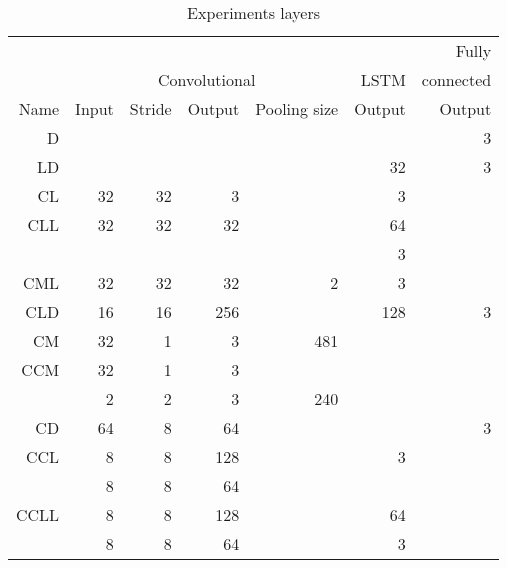 \begin{table}[!ht]
    \centering
    \caption{Experiments layers}
    \label{tab:carvinglayers}
\begin{tabular}{r|r|r|r|r|r|r}

       & \multicolumn{4}{|c|}{}                         &        & Fully           \\     
       & \multicolumn{4}{|c|}{Convolutional}            & LSTM   &       connected \\ \hline
Name   & Input         & Stride & Output & Pooling size & Output & Output          \\ \hline\hline

D      &               &        &        &              &        & 3               \\ \hline
LD     &               &        &        &              & 32     & 3               \\ \hline
CL     & 32            & 32     & 3      &              & 3      &                 \\ \hline
\hline
CLL    & 32            & 32     & 32     &              & 64     &                 \\       
       &               &        &        &              & 3      &                 \\ \hline
CML    & 32            & 32     & 32     & 2            & 3      &                 \\ \hline
CLD    & 16            & 16     & 256    &              & 128    & 3               \\ \hline
\hline
CM     & 32            & 1      & 3      & 481          &        &                 \\ \hline
CCM    & 32            & 1      & 3      &              &        &                 \\       
       & 2             & 2      & 3      & 240          &        &                 \\ \hline
CD     & 64            & 8      & 64     &              &        & 3               \\ \hline
\hline
CCL    & 8             & 8      & 128    &              & 3      &                 \\       
       & 8             & 8      & 64     &              &        &                 \\ \hline
CCLL   & 8             & 8      & 128    &              & 64     &                 \\       
       & 8             & 8      & 64     &              & 3      &                 \\ \hline


\end{tabular}
\end{table}
